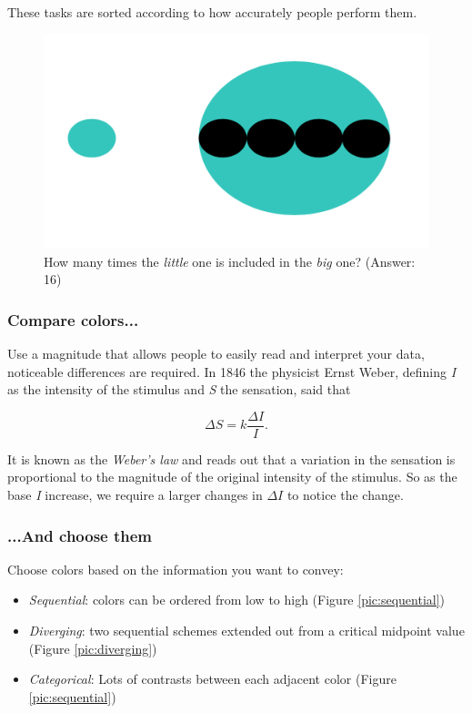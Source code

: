 \newpage
These tasks are sorted according to how accurately people perform them.

\begin{figure}[h]%
 \centering
 \includegraphics[width=12cm]{./img/06/area}
 \caption{\label{pic:area} How many times the \emph{little} one is included in the \emph{big} one? (Answer: 16)}
\end{figure}

\subsubsection*{Compare colors...}
Use a magnitude that allows people to easily read and interpret your data, noticeable differences are required. In 1846 the physicist Ernst Weber, defining \emph{I} as the intensity of the stimulus and \emph{S} the sensation, said that

$$\Delta S = k \frac{\Delta I}{I}.$$

It is known as the \emph{Weber's law} and reads out that a variation in the sensation is proportional to the magnitude of the original intensity of the stimulus. So as the base \emph{I} increase, we require a larger changes in  $\Delta I$ to notice the change. 

\subsubsection*{...And choose them}

Choose colors based on the information you want to convey:

\begin{itemize}
\item \emph{Sequential}: colors can be ordered from low to high (Figure \ref{pic:sequential})
\item \emph{Diverging}: two sequential schemes extended out from a critical midpoint value (Figure \ref{pic:diverging})
\item \emph{Categorical}: Lots of contrasts between each adjacent color (Figure \ref{pic:sequential})
\end{itemize}

